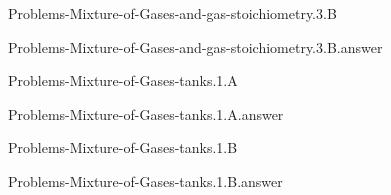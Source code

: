 \documentclass[main.tex]{subfiles}
\newcommand\chapterlabel{}
\begin{document}
\renewcommand\chapterlabel{Ch-Gas}
\begin{question}[ID=\the\value{numA}]
{Problems-Mixture-of-Gases-and-gas-stoichiometry.3.B}
\end{question}
   \begin{Form}
   \TextField[multiline,backgroundcolor=gray!20,borderwidth=0,width=0.43\textwidth  ,height=115pt, name=\the\value{numA}]  { }\end{Form}
\begin{solution}
{Problems-Mixture-of-Gases-and-gas-stoichiometry.3.B.answer}
\hspace{0.1cm}
\end{solution}


\renewcommand\chapterlabel{Ch-Gas}
\begin{question}[ID=\the\value{numA}]
{Problems-Mixture-of-Gases-tanks.1.A}
\end{question}
   \begin{Form}
   \TextField[multiline,backgroundcolor=gray!20,borderwidth=0,width=0.43\textwidth  ,height=115pt, name=\the\value{numA}]  { }\end{Form}
\begin{solution}
{Problems-Mixture-of-Gases-tanks.1.A.answer}
\hspace{0.1cm}
\end{solution}


\renewcommand\chapterlabel{Ch-Gas}
\begin{question}[ID=\the\value{numA}]
{Problems-Mixture-of-Gases-tanks.1.B}
\end{question}
   \begin{Form}
   \TextField[multiline,backgroundcolor=gray!20,borderwidth=0,width=0.43\textwidth  ,height=115pt, name=\the\value{numA}]  { }\end{Form}
\begin{solution}
{Problems-Mixture-of-Gases-tanks.1.B.answer}
\hspace{0.1cm}
\end{solution}
\end{document}

